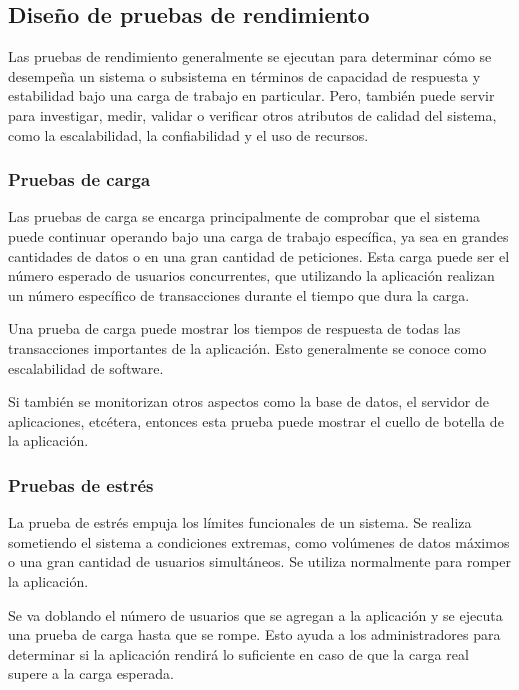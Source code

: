\subsection{Diseño de pruebas de rendimiento}

Las pruebas de rendimiento generalmente se ejecutan para determinar cómo se desempeña un sistema o subsistema en términos de capacidad de respuesta y estabilidad bajo una carga de trabajo en particular. Pero, también puede servir para investigar, medir, validar o verificar otros atributos de calidad del sistema, como la escalabilidad, la confiabilidad y el uso de recursos.

\subsubsection{Pruebas de carga}

Las pruebas de carga se encarga principalmente de comprobar que el sistema puede continuar operando bajo una carga de trabajo específica, ya sea en grandes cantidades de datos o en una gran cantidad de peticiones. Esta carga puede ser el número esperado de usuarios concurrentes, que utilizando la aplicación realizan un número específico de transacciones durante el tiempo que dura la carga.

Una prueba de carga puede mostrar los tiempos de respuesta de todas las transacciones importantes de la aplicación. Esto generalmente se conoce como escalabilidad de software.

Si también se monitorizan otros aspectos como la base de datos, el servidor de aplicaciones, etcétera, entonces esta prueba puede mostrar el cuello de botella de la aplicación.

\subsubsection{Pruebas de estrés}

La prueba de estrés empuja los límites funcionales de un sistema. Se realiza sometiendo el sistema a condiciones extremas, como volúmenes de datos máximos o una gran cantidad de usuarios simultáneos. Se utiliza normalmente para romper la aplicación.

Se va doblando el número de usuarios que se agregan a la aplicación y se ejecuta una prueba de carga hasta que se rompe. Esto ayuda a los administradores para determinar si la aplicación rendirá lo suficiente en caso de que la carga real supere a la carga esperada.

